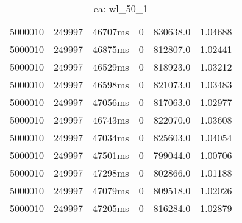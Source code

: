 \documentclass[./main.tex]{subfiles}
\begin{document}
\begin{table}
\begin{tabular}{ c | c | c | c | c | c }
        \hline
        5000010 & 249997 & 46707ms & 0 & 830638.0 & 1.04688 \\
        5000010 & 249997 & 46875ms & 0 & 812807.0 & 1.02441 \\
        5000010 & 249997 & 46529ms & 0 & 818923.0 & 1.03212 \\
        5000010 & 249997 & 46598ms & 0 & 821073.0 & 1.03483 \\
        \rowcolor{lightgray} 5000010 & 249997 & 47056ms & 0 & 817063.0 & 1.02977 \\
        5000010 & 249997 & 46743ms & 0 & 822070.0 & 1.03608 \\
        5000010 & 249997 & 47034ms & 0 & 825603.0 & 1.04054 \\
        5000010 & 249997 & 47501ms & 0 & 799044.0 & 1.00706 \\
        5000010 & 249997 & 47298ms & 0 & 802866.0 & 1.01188 \\
        5000010 & 249997 & 47079ms & 0 & 809518.0 & 1.02026 \\
        5000010 & 249997 & 47205ms & 0 & 816284.0 & 1.02879 \\
    \end{tabular}
    \caption{ea: wl\_50\_1}
\end{table}
\end{document}

